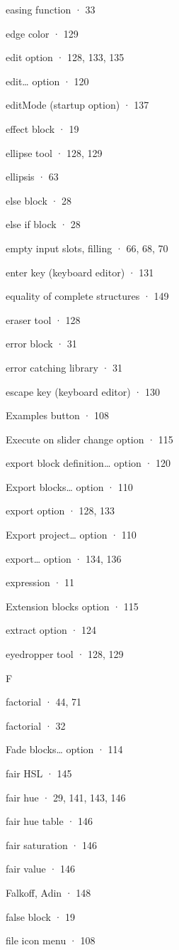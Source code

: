 \documentclass[
  letterpaper,
]{book}
\begin{document}
easing function · 33

edge color · 129

edit option · 128, 133, 135

edit\ldots{} option · 120

editMode (startup option) · 137

effect block · 19

ellipse tool · 128, 129

ellipsis · 63

else block · 28

else if block · 28

empty input slots, filling · 66, 68, 70

enter key (keyboard editor) · 131

equality of complete structures · 149

eraser tool · 128

error block · 31

error catching library · 31

escape key (keyboard editor) · 130

Examples button · 108

Execute on slider change option · 115

export block definition\ldots{} option · 120

Export blocks\ldots{} option · 110

export option · 128, 133

Export project\ldots{} option · 110

export\ldots{} option · 134, 136

expression · 11

Extension blocks option · 115

extract option · 124

eyedropper tool · 128, 129

F

factorial · 44, 71

factorial · 32

Fade blocks\ldots{} option · 114

fair HSL · 145

fair hue · 29, 141, 143, 146

fair hue table · 146

fair saturation · 146

fair value · 146

Falkoff, Adin · 148

false block · 19

file icon menu · 108
\end{document}
